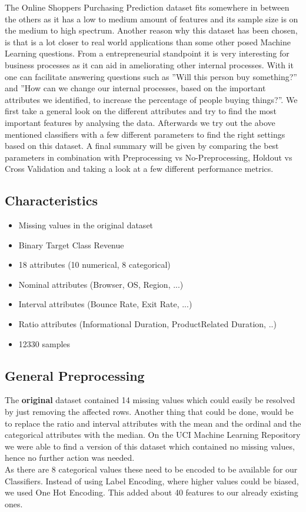 
The Online Shoppers Purchasing Prediction dataset fits somewhere in between the others as it has a low to medium amount of features and its sample size is on the medium to high spectrum. Another reason why  this dataset has been chosen, is that is a lot closer to real world applications than some other posed Machine Learning questions. From a entrepreneurial standpoint it is very interesting for business processes as it can aid in ameliorating other internal processes. With it one can facilitate answering questions such as ''Will this person buy something?'' and ''How can we change our internal processes, based on the important attributes we identified, to increase the percentage of people buying things?''. We first take a general look on the different attributes and try to find the most important features by analysing the data. Afterwards we try out the above mentioned classifiers with a few different parameters to find the right settings based on this dataset. A final summary will be given by comparing the best parameters in combination with Preprocessing vs No-Preprocessing, Holdout vs Cross Validation and taking a look at a few different performance metrics.

\subsection{Characteristics}

\begin{itemize}
\item Missing values in the original dataset
\item Binary Target Class Revenue
\item 18 attributes (10 numerical, 8 categorical)
\item Nominal attributes (Browser, OS, Region, ...)
\item Interval attributes (Bounce Rate, Exit Rate, ...)
\item Ratio attributes (Informational Duration, ProductRelated Duration, ..)
\item 12330 samples
\end{itemize}

\subsection{General Preprocessing} \label{GenPrepro}
The \textbf{original} dataset contained 14 missing values which could easily be resolved by just removing the affected rows. Another thing that could be done, would be to replace the ratio and interval attributes with the mean and the ordinal and the categorical attributes with the median. On the UCI Machine Learning Repository we were able to find a version of this dataset which contained no missing values, hence no further action was needed. \\
\newline
As there are 8 categorical values these need to be encoded to be available for our Classifiers. Instead of using Label Encoding, where higher values could be biased, we used One Hot Encoding. This added about 40 features to our already existing ones.

